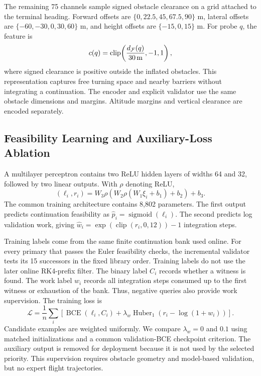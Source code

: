 \documentclass[journal]{IEEEtran}
\newcommand{\clip}{\operatorname{clip}}
\begin{document}
The remaining 75 channels sample signed obstacle clearance on a grid attached to the terminal heading. Forward offsets are $\{0,22.5,45,67.5,90\}$ m, lateral offsets are $\{-60,-30,0,30,60\}$ m, and height offsets are $\{-15,0,15\}$ m. For probe $q$, the feature is
\begin{equation}
 c(q)=\clip\!\left(\frac{d_{\mathcal F}(q)}{30\,{\rm m}},-1,1\right),
\end{equation}
where signed clearance is positive outside the inflated obstacles. This representation captures free turning space and nearby barriers without integrating a continuation. The encoder and explicit validator use the same obstacle dimensions and margins. Altitude margins and vertical clearance are encoded separately.

\subsection{Feasibility Learning and Auxiliary-Loss Ablation}
A multilayer perceptron contains two ReLU hidden layers of widths 64 and 32, followed by two linear outputs. With $\rho$ denoting ReLU,
\begin{equation}
 (\ell_i,r_i)=W_3\rho\!\left(W_2\rho(W_1\xi_i+b_1)+b_2\right)+b_3.
\end{equation}
The common training architecture contains 8,802 parameters. The first output predicts continuation feasibility as $\hat p_i=\operatorname{sigmoid}(\ell_i)$. The second predicts log validation work, giving $\hat w_i=\exp(\clip(r_i,0,12))-1$ integration steps.

Training labels come from the same finite continuation bank used online. For every primary that passes the Euler feasibility checks, the incremental validator tests its 15 successors in the fixed library order. Training labels do not use the later online RK4-prefix filter. The binary label $C_i$ records whether a witness is found. The work label $w_i$ records all integration steps consumed up to the first witness or exhaustion of the bank. Thus, negative queries also provide work supervision. The training loss is
\begin{equation}
 \mathcal L=\frac{1}{n}\sum_i\left[
 \operatorname{BCE}(\ell_i,C_i)
 +\lambda_w\operatorname{Huber}_1(r_i-\log(1+w_i))\right].
 \label{eq:learning_loss}
\end{equation}
Candidate examples are weighted uniformly. We compare $\lambda_w=0$ and $0.1$ using matched initializations and a common validation-BCE checkpoint criterion. The auxiliary output is removed for deployment because it is not used by the selected priority. This supervision requires obstacle geometry and model-based validation, but no expert flight trajectories.
\end{document}
